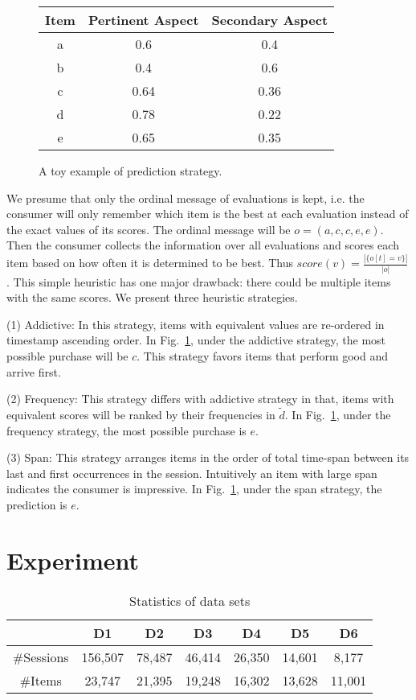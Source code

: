 \documentclass[sigconf]{acmart}
\begin{document}
\begin{figure}[htbp]
\begin{center}
\begin{tabular}{|c|c|c|}
\hline
Item & Pertinent Aspect & Secondary Aspect \\\hline
a & 0.6 & 0.4 \\
b & 0.4 & 0.6  \\
c & 0.64 & 0.36 \\
d & 0.78 & 0.22 \\
e & 0.65 & 0.35 \\\hline
\end{tabular}
\caption{A toy example of prediction strategy. }\label{fig:illustration}
\end{center}
\end{figure}


We presume that only the ordinal message of evaluations is kept, i.e. the consumer will only remember which item is the best at each evaluation instead of the exact values of its scores. The ordinal message will be $o=(a,c,c,e,e)$. Then the consumer collects the information over all evaluations and scores each item based on how often it is determined to be best. Thus $score(v)=\frac{|\{o[t] = v\}|}{|o|}$. This simple heuristic has one major drawback: there could be multiple items with the same scores. We present three heuristic strategies.



(1) Addictive: In this strategy,  items with equivalent values are re-ordered in timestamp ascending order. In Fig.~\ref{fig:illustration},  under the addictive strategy, the most possible purchase will be $c$. This strategy favors items that perform good and arrive first.

(2) Frequency: This strategy differs with addictive strategy in that, items with equivalent scores will be ranked by their frequencies in $\tilde{d}$. In Fig.~\ref{fig:illustration},  under the frequency strategy, the most possible purchase is $e$.

(3) Span: This strategy arranges items in the order of total time-span between its last and first occurrences in the session. Intuitively an item with large span indicates the  consumer is impressive. In Fig.~\ref{fig:illustration}, under the span strategy, the prediction is $e$.


\section{Experiment}\label{sec:experiment}
\begin{table}[htp]
\caption{Statistics of data sets}
\begin{center}
\begin{tabular}{|c|c|c|c|c|c|c|}
\hline
 &D1 &D2 &D3 & D4 & D5 & D6 \\\hline
\#Sessions & 156,507& 78,487 & 46,414&26,350 &14,601 &8,177\\\hline
\#Items & 23,747& 21,395 &19,248 & 16,302& 13,628&11,001\\\hline
\end{tabular}
\end{center}
\label{tab:data}
\end{table}%
\end{document}
